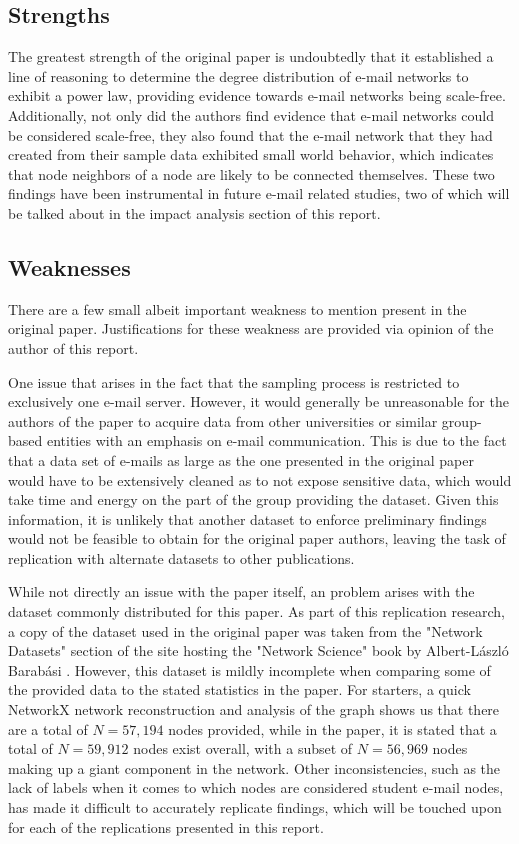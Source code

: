 \documentclass[a4paper]{article}
\begin{document}
\begin{multicols}{2}
\subsection{Strengths}
\hspace*{\parindent}The greatest strength of the original paper is undoubtedly that it established a line of reasoning to determine the degree distribution of e-mail networks to exhibit a power law, providing evidence towards e-mail networks being scale-free. Additionally, not only did the authors find evidence that e-mail networks could be considered scale-free, they also found that the e-mail network that they had created from their sample data exhibited small world behavior, which indicates that node neighbors of a node are likely to be connected themselves. These two findings have been instrumental in future e-mail related studies, two of which will be talked about in the impact analysis section of this report.	

\subsection{Weaknesses}
\hspace*{\parindent}There are a few small albeit important weakness to mention present in the original paper. Justifications for these weakness are provided via opinion of the author of this report.

One issue that arises in the fact that the sampling process is restricted to exclusively one e-mail server. However, it would generally be unreasonable for the authors of the paper to acquire data from other universities or similar group-based entities with an emphasis on e-mail communication. This is due to the fact that a data set of e-mails as large as the one presented in the original paper would have to be extensively cleaned as to not expose sensitive data, which would take time and energy on the part of the group providing the dataset. Given this information, it is unlikely that another dataset to enforce preliminary findings would not be feasible to obtain for the original paper authors, leaving the task of replication with alternate datasets to other publications.

While not directly an issue with the paper itself, an problem arises with the dataset commonly distributed for this paper. As part of this replication research, a copy of the dataset used in the original paper was taken from the "Network Datasets" section of the site hosting the "Network Science" book by Albert-László Barabási \cite{3}. However, this dataset is mildly incomplete when comparing some of the provided data to the stated statistics in the paper. For starters, a quick NetworkX network reconstruction and analysis of the graph shows us that there are a total of \(N = 57,	194\) nodes provided, while in the paper, it is stated that a total of \(N = 59,912\) nodes exist overall, with a subset of \(N = 56,969\) nodes making up a giant component in the network. Other inconsistencies, such as the lack of labels when it comes to which nodes are considered student e-mail nodes, has made it difficult to accurately replicate findings, which will be touched upon for each of the replications presented in this report. 


\end{multicols}
\end{document}
